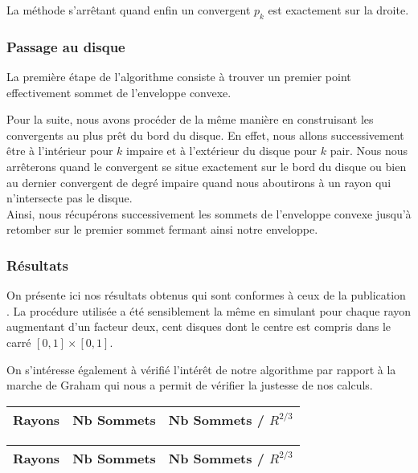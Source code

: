 La méthode s’arrêtant quand enfin un convergent $p_{k}$ est exactement sur la droite.


\subsubsection{Passage au disque}

La première étape de l'algorithme consiste à trouver un premier point effectivement sommet de l'enveloppe convexe. 

Pour la suite, nous avons procéder de la même manière en construisant les convergents au plus prêt du bord du disque. En effet, nous allons successivement être à l'intérieur pour $k$ impaire et à l'extérieur du disque pour $k$ pair. Nous nous arrêterons quand le convergent se situe exactement sur le bord du disque ou bien au dernier convergent de degré impaire quand nous aboutirons à un rayon qui n'intersecte pas le disque.\\

Ainsi, nous récupérons successivement les sommets de l'enveloppe convexe jusqu'à retomber sur le premier sommet fermant ainsi notre enveloppe.


\subsubsection{Résultats}


On présente ici nos résultats obtenus qui sont conformes à ceux de la publication \cite{HarPeled98}. La procédure utilisée a été sensiblement la même en simulant pour chaque rayon augmentant d'un facteur deux, cent disques dont le centre est compris dans le carré $[0,1]\times[0,1]$.

On s'intéresse également à vérifié l'intérêt de notre algorithme par rapport à la marche de Graham qui nous a permit de vérifier la justesse de nos calculs. 


\begin{tabular}{|l||c|c|}
\hline
Rayons & Nb Sommets & Nb Sommets / $R^{2/3}$\\
\hline

\hline
\end{tabular} 

\begin{tabular}{|l||c|c|}
\hline
Rayons & Nb Sommets & Nb Sommets / $R^{2/3}$\\
\hline

\hline
\end{tabular} 

